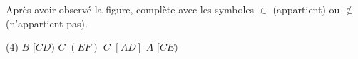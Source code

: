 \documentclass[a4paper,11pt]{report}
\begin{document}
\begin{exop}
{Après avoir observé la figure, complète avec les symboles $\in$ (appartient) ou $\notin$ (n'appartient pas).
\begin{tasks}(4)
    \task $B$  $[CD)$
    \task $C$  $(EF)$
    \task $C$  $[AD]$
    \task $A$  $[CE)$
\end{tasks}
\begin{center}

\end{center}}
\end{exop}
\end{document}
